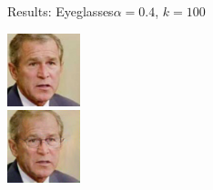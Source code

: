 \documentclass[11pt]{beamer}
\begin{document}
\begin{frame}{Results: Eyeglasses}{$\alpha=0.4$, $k=100$}
\begin{minipage}{81px}
	\end{minipage}%
	\begin{minipage}{81px}
		\includegraphics[width=80px]{../pictures/outputs/start-imgs/Bush.png}\\
		\includegraphics[width=80px]{../pictures/outputs/eyeglasses_alpha0.4_k100/Bush.png}
	\end{minipage}
\end{frame}

\end{document}
